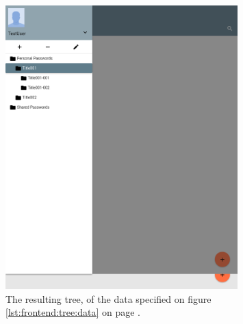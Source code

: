 		\begin{figure}[p]
			\centering
			\includegraphics[width=0.8\textwidth,clip,trim=0 690 536 210]{figures/implementation/screenshots/example_tree.png}
			\caption{The resulting tree, of the data specified on figure \ref{lst:frontend:tree:data} on page \pageref{lst:frontend:tree:data}.}
			\label{lst:frontend:tree:result}
		\end{figure}
